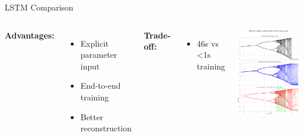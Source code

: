\documentclass{beamer}
\begin{document}
\begin{frame}{LSTM Comparison}
  \begin{columns}
    \textbf{Advantages:}
    \begin{itemize}
      \item Explicit parameter input
      \item End-to-end training
      \item Better reconstruction
    \end{itemize}
    \textbf{Trade-off:}
    \begin{itemize}
      \item 46s vs <1s training
    \end{itemize}
    
    \includegraphics[width=\textwidth]{figures/lstm_bd_1.png}
  \end{columns}
\end{frame}
\end{document}
